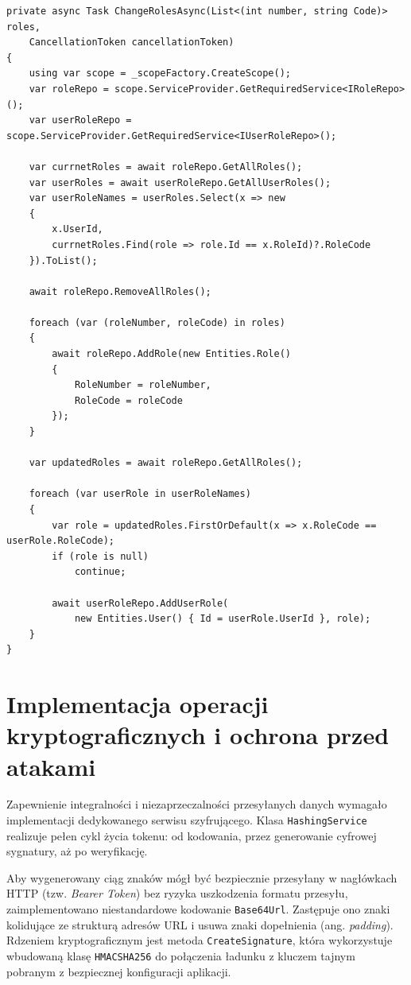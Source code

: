 \documentclass{SGGW-thesis}
\begin{document}
\begin{minipage}{\textwidth}
\begin{lstlisting}   
private async Task ChangeRolesAsync(List<(int number, string Code)> roles, 
    CancellationToken cancellationToken)
{
    using var scope = _scopeFactory.CreateScope();
    var roleRepo = scope.ServiceProvider.GetRequiredService<IRoleRepo>();
    var userRoleRepo = scope.ServiceProvider.GetRequiredService<IUserRoleRepo>();
    
    var currnetRoles = await roleRepo.GetAllRoles();
    var userRoles = await userRoleRepo.GetAllUserRoles();
    var userRoleNames = userRoles.Select(x => new
    {
        x.UserId,
        currnetRoles.Find(role => role.Id == x.RoleId)?.RoleCode
    }).ToList();

    await roleRepo.RemoveAllRoles();

    foreach (var (roleNumber, roleCode) in roles)
    {
        await roleRepo.AddRole(new Entities.Role() 
        { 
            RoleNumber = roleNumber, 
            RoleCode = roleCode 
        });
    }

    var updatedRoles = await roleRepo.GetAllRoles();

    foreach (var userRole in userRoleNames)
    {
        var role = updatedRoles.FirstOrDefault(x => x.RoleCode == userRole.RoleCode);
        if (role is null)
            continue;
        
        await userRoleRepo.AddUserRole(
            new Entities.User() { Id = userRole.UserId }, role);
    }
}
\end{lstlisting}
\end{minipage}

\clearpage

\section{Implementacja operacji kryptograficznych i ochrona przed atakami}

Zapewnienie integralności i niezaprzeczalności przesyłanych danych wymagało implementacji dedykowanego serwisu szyfrującego. Klasa \texttt{HashingService} realizuje pełen cykl życia tokenu: od kodowania, przez generowanie cyfrowej sygnatury, aż po weryfikację. 

Aby wygenerowany ciąg znaków mógł być bezpiecznie przesyłany w nagłówkach HTTP (tzw. \textit{Bearer Token}) bez ryzyka uszkodzenia formatu przesyłu, zaimplementowano niestandardowe kodowanie \texttt{Base64Url}. Zastępuje ono znaki kolidujące ze strukturą adresów URL i usuwa znaki dopełnienia (ang. \textit{padding}). Rdzeniem kryptograficznym jest metoda \texttt{CreateSignature}, która wykorzystuje wbudowaną klasę \texttt{HMACSHA256} do połączenia ładunku z kluczem tajnym pobranym z bezpiecznej konfiguracji aplikacji.
\end{document}
